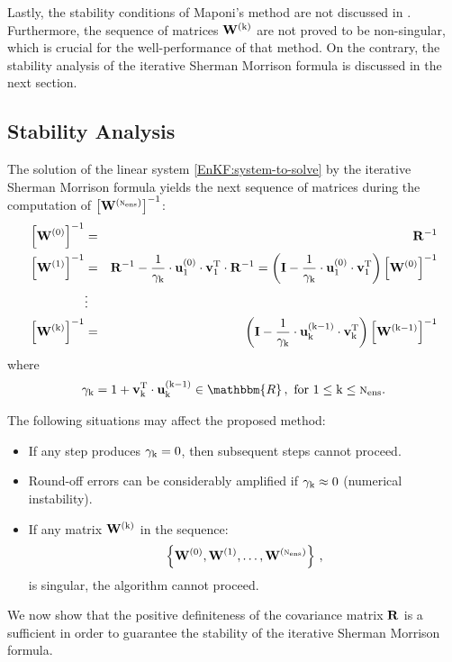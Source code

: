 \documentclass[12pt]{article}
\newcommand{\inv}[1]{\left[{\bf W^{(\rm #1)}}\right]^{\rm -1}}
\newcommand{\Nens}{\textsc{n}_{{\rm ens}}}
\newcommand{\R}{{\bf R}}
\renewcommand{\u}[2]{{\bf u}_{\rm #1}^{(\rm #2)}}
\newcommand{\W}[1]{{{\bf W}^{\left ( {\rm #1} \right )}}}
\renewcommand{\v}[1]{{\bf v}_{{\rm #1}}}
\renewcommand{\Re}{\mathbbm{R}}
\newcommand{\invS}[1]{ {#1^{-1}}}
\renewcommand{\k}{{\rm k}}
\begin{document}
Lastly, the stability conditions of Maponi's method are not discussed in \cite{Maponi2007276}. Furthermore, the sequence of matrices $\W{\k}$ are not proved to be non-singular, which is crucial for the well-performance of that method. On the contrary, the stability analysis of the iterative Sherman Morrison formula is discussed in the next section.

\subsection{Stability Analysis}
\label{EnKSM:stability-iterative-method}

The solution of the linear system \eqref{EnKF:system-to-solve} by the iterative Sherman Morrison formula yields the next sequence of matrices during the computation of $\left[\W{\Nens}\right]^{-1}$:
\begin{eqnarray*}
\displaystyle 
\inv{0} &=& \invS{\R} \\
\inv{1} &=& \invS{\R}-\frac{1}{\gamma_{\k}} \cdot \u{1}{0} \cdot \v{1}^{\rm T} \cdot \invS{\R} = \left( {\bf I}-\frac{1}{\gamma_{\k}} \cdot \u{1}{0} \cdot \v{1}^{\rm T}\right ) \inv{0} \\
& \vdots & \\
\inv{\k} &=& \left( {\bf I}-\frac{1}{\gamma_{\k}} \cdot \u{\k}{\k-1} \cdot \v{\k}^{\rm T}\right ) \inv{\k-1} 
\end{eqnarray*}
where 
\begin{eqnarray*}
\displaystyle \gamma_{\k} = 1+\v{\k}^{\rm T} \cdot \u{\k}{\k-1} \in \Re\,,\text{ for $1 \le \k \le \Nens$.}
\end{eqnarray*}

The following situations may affect the proposed method:
\begin{itemize}
\item If any step produces $\gamma_{\k} = 0$, then subsequent steps cannot proceed.
\item Round-off errors can be considerably amplified if $\gamma_{\k} \approx 0$ (numerical instability). \item If any matrix $\W{\k}$ in the sequence:
\begin{eqnarray}
\label{EnKSM:sequence-of-matrices}
\displaystyle \left \{  \W{0}, \W{1}, \ldots, \W{\Nens} \right \}\,,
\end{eqnarray}
is singular, the algorithm cannot proceed. 
\end{itemize} 

We now show that the positive definiteness of the covariance matrix $\R$ is a sufficient in order to guarantee the stability of the iterative Sherman Morrison formula.
 
\end{document}
